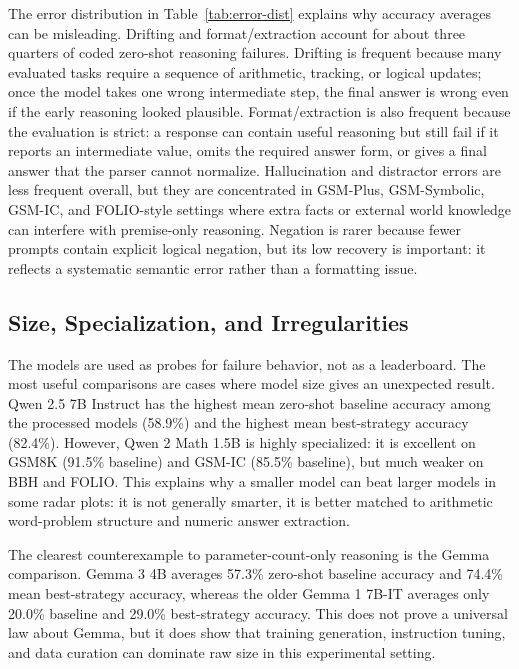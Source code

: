 \documentclass[10pt,twocolumn]{article}
\begin{document}
The error distribution in Table~\ref{tab:error-dist} explains why accuracy averages can be misleading. Drifting and format/extraction account for about three quarters of coded zero-shot reasoning failures. Drifting is frequent because many evaluated tasks require a sequence of arithmetic, tracking, or logical updates; once the model takes one wrong intermediate step, the final answer is wrong even if the early reasoning looked plausible. Format/extraction is also frequent because the evaluation is strict: a response can contain useful reasoning but still fail if it reports an intermediate value, omits the required answer form, or gives a final answer that the parser cannot normalize. Hallucination and distractor errors are less frequent overall, but they are concentrated in GSM-Plus, GSM-Symbolic, GSM-IC, and FOLIO-style settings where extra facts or external world knowledge can interfere with premise-only reasoning. Negation is rarer because fewer prompts contain explicit logical negation, but its low recovery is important: it reflects a systematic semantic error rather than a formatting issue.

\subsection{Size, Specialization, and Irregularities}
The models are used as probes for failure behavior, not as a leaderboard. The most useful comparisons are cases where model size gives an unexpected result. Qwen 2.5 7B Instruct has the highest mean zero-shot baseline accuracy among the processed models (58.9\%) and the highest mean best-strategy accuracy (82.4\%). However, Qwen 2 Math 1.5B is highly specialized: it is excellent on GSM8K (91.5\% baseline) and GSM-IC (85.5\% baseline), but much weaker on BBH and FOLIO. This explains why a smaller model can beat larger models in some radar plots: it is not generally smarter, it is better matched to arithmetic word-problem structure and numeric answer extraction.

The clearest counterexample to parameter-count-only reasoning is the Gemma comparison. Gemma 3 4B averages 57.3\% zero-shot baseline accuracy and 74.4\% mean best-strategy accuracy, whereas the older Gemma 1 7B-IT averages only 20.0\% baseline and 29.0\% best-strategy accuracy. This does not prove a universal law about Gemma, but it does show that training generation, instruction tuning, and data curation can dominate raw size in this experimental setting.
\end{document}
